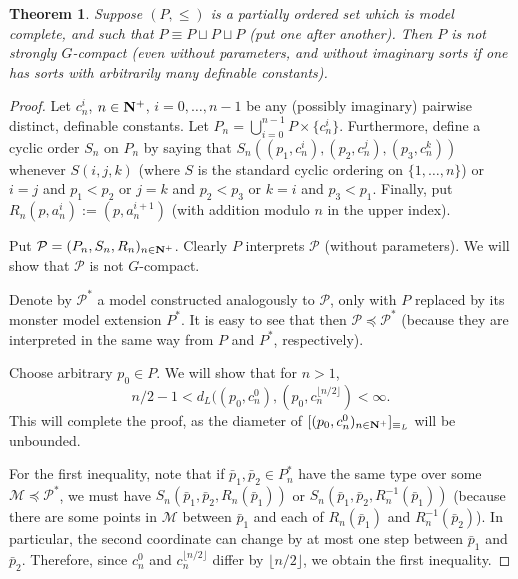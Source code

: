 \documentclass[final,a4paper,12pt]{amsart}
\DeclareMathOperator{\Th}{{Th}}
\newtheorem{thm}{Theorem}[section]
\theoremstyle{remark}
\theoremstyle{definition}
\newcounter{claimcounter}[thm]
\newenvironment{clm}{\stepcounter{claimcounter}{\noindent {\textbf{Claim}} \theclaimcounter:}}{}
\newenvironment{clmproof}[1][\proofname]{\proof[#1]\renewcommand{\qedsymbol}{$\square$(claim)}}{\endproof}
\begin{document}
	\begin{thm}
		Suppose $(P,\leq)$ is a partially ordered set which is model complete, and such that $P\equiv P\sqcup P\sqcup P$ (put one after another). Then $P$ is not strongly $G$-compact (even without parameters, and without imaginary sorts if one has sorts with arbitrarily many definable constants).
	\end{thm}
	\begin{proof}
		Let $c_n^i$, $n\in {\bf N}^+$, $i=0,\ldots,n-1$ be any (possibly imaginary) pairwise distinct, definable constants. Let $P_n=\bigcup_{i=0}^{n-1} P\times \{c_n^i\}$. Furthermore, define a cyclic order $S_n$ on $P_n$ by saying that $S_n((p_1,c_n^i),(p_2,c_n^j),(p_3,c_n^k))$ whenever $S(i,j,k)$ (where $S$ is the standard cyclic ordering on $\{1,\ldots,n\}$) or $i=j$ and $p_1<p_2$ or $j=k$ and $p_2<p_3$ or $k=i$ and $p_3<p_1$. Finally, put $R_n(p,a_n^i):=(p,a_n^{i+1})$ (with addition modulo $n$ in the upper index).
		
		Put $\mathcal P=(P_n,S_n,R_n)_{n\in {\bf N}^+}$. Clearly $P$ interprets $\mathcal P$ (without parameters). We will show that $\mathcal P$ is not $G$-compact.
		
		Denote by $\mathcal P^*$ a model constructed analogously to $\mathcal P$, only with $P$ replaced by its monster model extension $P^*$. It is easy to see that then $\mathcal P\preceq \mathcal P^*$ (because they are interpreted in the same way from $P$ and $P^*$, respectively).
%		
		
		Choose arbitrary $p_0\in P$. We will show that for $n>1$,
		\[
			n/2-1<d_L((p_0,c_n^0),(p_0,c_n^{\lfloor n/2\rfloor})<\infty.
		\]
		This will complete the proof, as the diameter of $[(p_0,c_n^0)_{n\in {\bf N}^+}]_{\equiv_L}$ will be unbounded.
		
		For the first inequality, note that if $\bar p_1, \bar p_2\in P_n^*$ have the same type over some $\mathcal M\preceq \mathcal P^*$, we must have $S_n(\bar p_1,\bar p_2,R_n(\bar p_1))$ or $S_n(\bar p_1,\bar p_2,R_n^{-1}(\bar p_1))$ (because there are some points in $\mathcal M$ between $\bar p_1$ and each of $R_n(\bar p_1)$ and $R_n^{-1}(\bar p_2)$). In particular, the second coordinate can change by at most one step between $\bar p_1$ and $\bar p_2$. Therefore, since $c_n^0$ and $c_n^{\lfloor n/2\rfloor}$ differ by $\lfloor n/2\rfloor$, we obtain the first inequality.
		

\end{proof}
\end{document}
